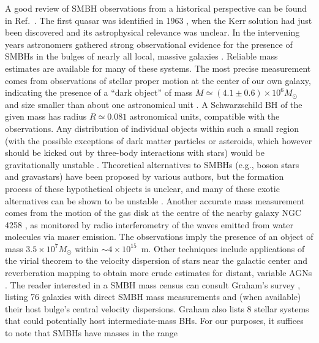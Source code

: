 \documentclass[]{iopart}
\begin{document}
A good review of SMBH observations from a historical perspective can be found
in Ref.~\cite{Melia:2007vt}. The first quasar was identified in 1963
\cite{Schmidt:1963}, when the Kerr solution had just been discovered
\cite{Kerr:1963ud} and its astrophysical relevance was unclear. In the
intervening years astronomers gathered strong observational evidence for the
presence of SMBHs in the bulges of nearly all local, massive galaxies
\cite{Kormendy:1995er,Magorrian:1998,McLure:2002}. Reliable mass estimates are
available for many of these systems.
%
The most precise measurement comes from observations of stellar proper motion
at the center of our own galaxy, indicating the presence of a ``dark object''
of mass $M\simeq (4.1\pm 0.6)\times 10^6M_\odot$
\cite{Schodel:2002py,Ghez:2008ms} and size smaller than about one astronomical
unit \cite{Shen:2005cw}. A Schwarzschild BH of the given mass has radius
$R\simeq 0.081$ astronomical units, compatible with the observations. Any
distribution of individual objects within such a small region (with the
possible exceptions of dark matter particles or asteroids, which however
should be kicked out by three-body interactions with stars) would be
gravitationally unstable \cite{Maoz:1998,ColemanMiller:2005tg}.  Theoretical
alternatives to SMBHs (e.g., boson stars and gravastars) have been proposed by
various authors, but the formation process of these hypothetical objects is
unclear, and many of these exotic alternatives can be shown to be unstable
\cite{Cardoso:2008kj,Pani:2009fd}.
%
Another accurate mass measurement comes from the motion of the gas disk at the
centre of the nearby galaxy NGC 4258 \cite{Herrnstein:1999cw}, as monitored by
radio interferometry of the waves emitted from water molecules via maser
emission. The observations imply the presence of an object of mass $3.5\times
10^7M_\odot$ within $\sim 4\times 10^{15}$~m.
%
Other techniques include applications of the virial theorem to the velocity
dispersion of stars near the galactic center \cite{Kormendy:1995er} and
reverberation mapping to obtain more crude estimates for distant, variable
AGNs \cite{Gebhardt:2000sb}. The reader interested in a SMBH mass census can
consult Graham's survey \cite{Graham:2008uh}, listing 76 galaxies with direct
SMBH mass measurements and (when available) their host bulge's central
velocity dispersions. Graham also lists 8 stellar systems that could
potentially host intermediate-mass BHs.
%
For our purposes, it suffices to note that SMBHs have masses in the range
\end{document}
